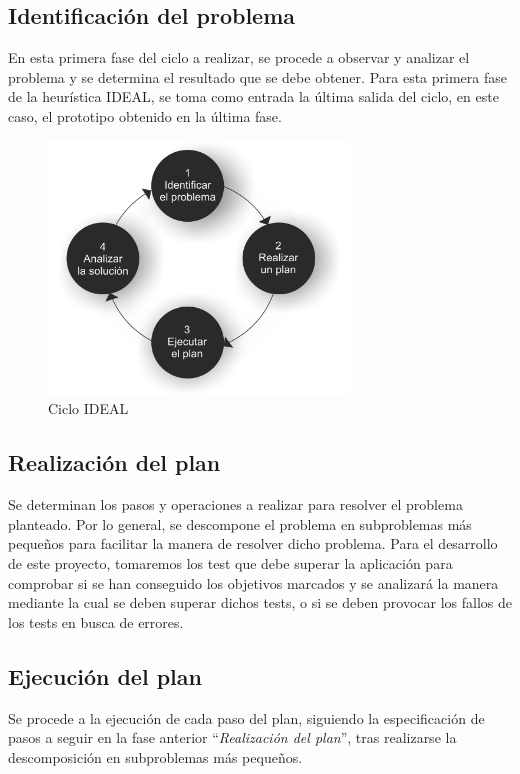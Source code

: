 \subsection{Identificación del problema}

En esta primera fase del ciclo a realizar, se procede a observar y analizar el problema y se determina el resultado que se debe obtener. Para esta primera fase de la heurística IDEAL, se toma como entrada la última salida del ciclo, en este caso, el prototipo obtenido en la última fase.

\begin{figure}[!h]
\centering
   \includegraphics[width=8cm]{Ciclo_IDEAL.png}
\caption{Ciclo IDEAL}
\end{figure}

\subsection{Realización del plan}

Se determinan los pasos y operaciones a realizar para resolver el problema planteado. Por lo general, se descompone el problema en subproblemas más pequeños para facilitar la manera de resolver dicho problema. Para el desarrollo de este proyecto, tomaremos los test que debe superar la aplicación para comprobar si se han conseguido los objetivos marcados y se analizará la manera mediante la cual se deben superar dichos tests, o si se deben provocar los fallos de los tests en busca de errores.

\subsection{Ejecución del plan}

Se procede a la ejecución de cada paso del plan, siguiendo la especificación de pasos a seguir en la fase anterior ``\textit{Realización del plan}'', tras realizarse la descomposición en subproblemas más pequeños.

